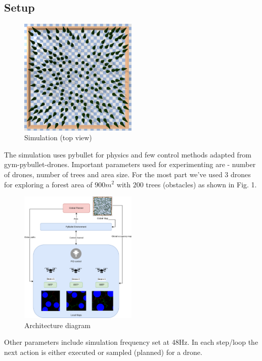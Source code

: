 \subsection{Setup}

\begin{figure}[h]
\centering
\includegraphics[width=0.5\textwidth]{images/SimulationImage.png}
\caption{Simulation (top view)}
\end{figure}


The simulation uses pybullet for physics and few control methods adapted from gym-pybullet-drones. Important parameters used for experimenting are - number of drones, number of trees and area size. For the most part we've used $3$ drones for exploring a forest area of $900m^2$ with $200$ trees (obstacles) as shown in Fig. 1. \\

\begin{figure}[h]
\centering
\includegraphics[width=0.5\textwidth]{images/arch_diag.png}
\caption{Architecture diagram}
\end{figure}

Other parameters include simulation frequency set at 48Hz. In each step/loop the next action is either executed or sampled (planned) for a drone.

